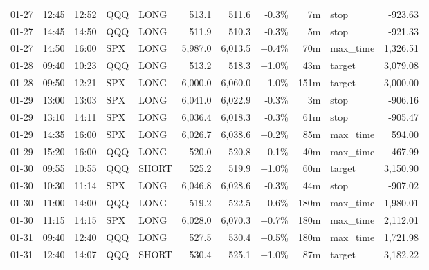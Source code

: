 \documentclass[11pt,a4paper,twoside]{article}
\begin{document}
\begin{center}
\begin{longtable}{>{\color{txtmain}}l l l l l r r r r >{\color{txtmain}}l r}
01-27 & 12:45 & 12:52 & QQQ & LONG & 513.1 & 511.6 & \textcolor{lossred}{-0.3\%} & 7m & stop & \textcolor{lossred}{-923.63} \\
01-27 & 14:45 & 14:50 & QQQ & LONG & 511.9 & 510.3 & \textcolor{lossred}{-0.3\%} & 5m & stop & \textcolor{lossred}{-921.33} \\
01-27 & 14:50 & 16:00 & SPX & LONG & 5,987.0 & 6,013.5 & \textcolor{wingreen}{+0.4\%} & 70m & max\_time & \textcolor{wingreen}{1,326.51} \\
01-28 & 09:40 & 10:23 & QQQ & LONG & 513.2 & 518.3 & \textcolor{wingreen}{+1.0\%} & 43m & target & \textcolor{wingreen}{3,079.08} \\
01-28 & 09:50 & 12:21 & SPX & LONG & 6,000.0 & 6,060.0 & \textcolor{wingreen}{+1.0\%} & 151m & target & \textcolor{wingreen}{3,000.00} \\
01-29 & 13:00 & 13:03 & SPX & LONG & 6,041.0 & 6,022.9 & \textcolor{lossred}{-0.3\%} & 3m & stop & \textcolor{lossred}{-906.16} \\
01-29 & 13:10 & 14:11 & SPX & LONG & 6,036.4 & 6,018.3 & \textcolor{lossred}{-0.3\%} & 61m & stop & \textcolor{lossred}{-905.47} \\
01-29 & 14:35 & 16:00 & SPX & LONG & 6,026.7 & 6,038.6 & \textcolor{wingreen}{+0.2\%} & 85m & max\_time & \textcolor{wingreen}{594.00} \\
01-29 & 15:20 & 16:00 & QQQ & LONG & 520.0 & 520.8 & \textcolor{wingreen}{+0.1\%} & 40m & max\_time & \textcolor{wingreen}{467.99} \\
01-30 & 09:55 & 10:55 & QQQ & SHORT & 525.2 & 519.9 & \textcolor{wingreen}{+1.0\%} & 60m & target & \textcolor{wingreen}{3,150.90} \\
01-30 & 10:30 & 11:14 & SPX & LONG & 6,046.8 & 6,028.6 & \textcolor{lossred}{-0.3\%} & 44m & stop & \textcolor{lossred}{-907.02} \\
01-30 & 11:00 & 14:00 & QQQ & LONG & 519.2 & 522.5 & \textcolor{wingreen}{+0.6\%} & 180m & max\_time & \textcolor{wingreen}{1,980.01} \\
01-30 & 11:15 & 14:15 & SPX & LONG & 6,028.0 & 6,070.3 & \textcolor{wingreen}{+0.7\%} & 180m & max\_time & \textcolor{wingreen}{2,112.01} \\
01-31 & 09:40 & 12:40 & QQQ & LONG & 527.5 & 530.4 & \textcolor{wingreen}{+0.5\%} & 180m & max\_time & \textcolor{wingreen}{1,721.98} \\
01-31 & 12:40 & 14:07 & QQQ & SHORT & 530.4 & 525.1 & \textcolor{wingreen}{+1.0\%} & 87m & target & \textcolor{wingreen}{3,182.22} \\

\end{longtable}
\end{center}
\end{document}
